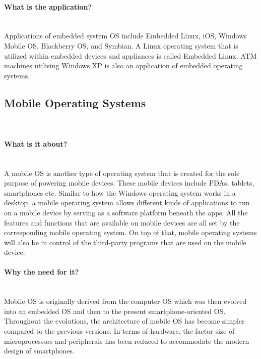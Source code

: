 \documentclass[conference]{IEEEtran}
\newcommand{\forceindent}{\leavevmode{\parindent=1em\indent}}
\begin{document}
\medskip
\paragraph{What is the application?}\mbox{} \\
\forceindent Applications of embedded system OS include Embedded Linux, iOS, Windows Mobile OS, Blackberry OS, and Symbian. A Linux operating system that is utilized within embedded devices and appliances is called Embedded Linux. ATM machines utilising Windows XP is also an application of embedded operating systems.

\subsection{Mobile Operating Systems}\\
\paragraph{What is it about?}\mbox{} \\
\forceindent A mobile OS is another type of operating system that is created for the sole purpose of powering mobile devices. These mobile devices include PDAs, tablets, smartphones etc. Similar to how the Windows operating system works in a desktop, a mobile operating system allows different kinds of applications to run on a mobile device by serving as a software platform beneath the apps. All the features and functions that are available on mobile devices are all set by the corresponding mobile operating system. On top of that, mobile operating systems will also be in control of the third-party programs that are used on the mobile device.
\medskip
\\
\paragraph{Why the need for it?}\mbox{} \\
\forceindent Mobile OS is originally derived from the computer OS which was then evolved into an embedded OS and then to the present smartphone-oriented OS. Throughout the evolutions, the architecture of mobile OS has become simpler compared to the previous versions. In terms of hardware, the factor size of microprocessors and peripherals has been reduced to accommodate the modern design of smartphones.
\end{document}
